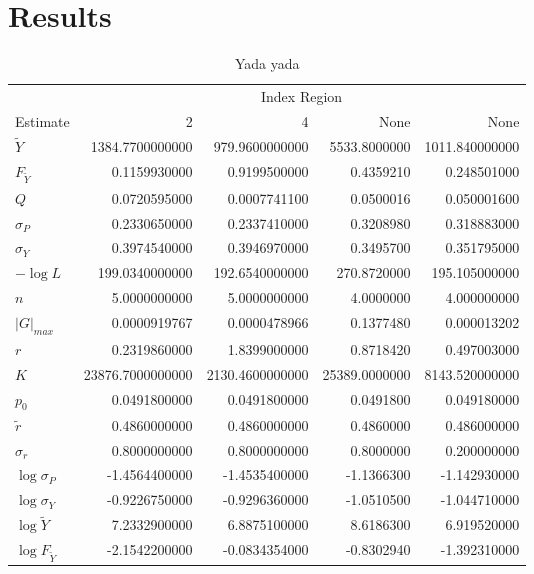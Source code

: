\documentclass[12pt,letterpaper]{article}
\newcommand\MSY{\widetilde{Y}}
\newcommand\Fmsy{F_{\MSY}}
\begin{document}
\section*{Results}


\begin{table}
\caption{Yada yada
}
\label{tab:ests1}
\begin{center}
\begin{tabular}{lrrrr}
\hline
 &\multicolumn{4}{c}{Index Region}\\
\cline{2-5}
Estimate &               2&              4&            None& None\\
\hline
\hline
$\MSY$       & 1384.7700000000& 979.9600000000& 5533.8000000&1011.840000000\\
$\Fmsy$      &    0.1159930000&   0.9199500000&    0.4359210& 0.248501000\\
$Q$            &    0.0720595000&   0.0007741100&    0.0500016& 0.050001600\\
$\sigma_P$    &    0.2330650000&   0.2337410000&    0.3208980& 0.318883000\\
$\sigma_Y$    &    0.3974540000&   0.3946970000&    0.3495700& 0.351795000\\
\hline
$-\log L$ &  199.0340000000& 192.6540000000&  270.8720000& 195.105000000\\
$n$       &    5.0000000000&   5.0000000000&    4.0000000& 4.000000000\\
$|G|_{max}$ &    0.0000919767&   0.0000478966&    0.1377480& 0.000013202\\
\hline
$r$          &    0.2319860000&   1.8399000000&    0.8718420& 0.497003000\\
$K$          &23876.7000000000&2130.4600000000&25389.0000000&8143.520000000\\
\hline
$p_0$         &    0.0491800000&   0.0491800000&    0.0491800& 0.049180000\\
$\tilde{r}$  &    0.4860000000&   0.4860000000&    0.4860000& 0.486000000\\
$\sigma_r$   &    0.8000000000&   0.8000000000&    0.8000000& 0.200000000\\
\hline
$\log\sigma_P$ &   -1.4564400000&  -1.4535400000&   -1.1366300& -1.142930000\\
$\log\sigma_Y$&   -0.9226750000&  -0.9296360000&   -1.0510500& -1.044710000\\
$\log\MSY$  &    7.2332900000&   6.8875100000&    8.6186300& 6.919520000\\
$\log\Fmsy$  &   -2.1542200000&  -0.0834354000&   -0.8302940& -1.392310000\\
\hline
\end{tabular}
\end{center}
\end{table}
\end{document}
